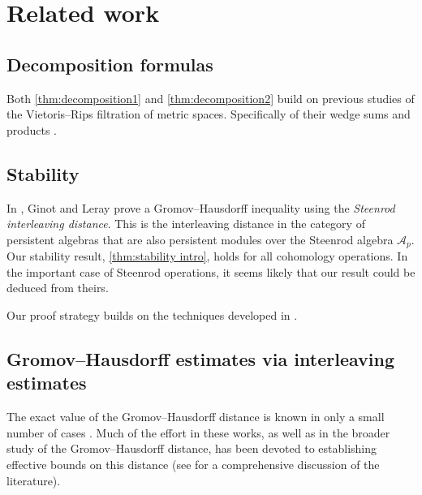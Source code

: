 
\section*{Related work}

\subsection*{Decomposition formulas}


Both \cref{thm:decomposition1} and \cref{thm:decomposition2} build on previous studies of the Vietoris--Rips filtration of metric spaces.
Specifically of their wedge sums \cite{adamaszek2020homotopy} and products \cite{adamaszek2017VietorisProduct, gakhar2019k, lim2024vietoris}.

\subsection*{Stability}

In \cite[Theorem~87]{ginot2019distances}, Ginot and Leray prove a Gromov--Hausdorff inequality using the \textit{Steenrod interleaving distance}.  
This is the interleaving distance in the category of persistent algebras that are also persistent modules over the Steenrod algebra \(\mathcal{A}_p\).
Our stability result, \cref{thm:stability intro}, holds for all cohomology operations.  
In the important case of Steenrod operations, it seems likely that our result could be deduced from theirs.  

Our proof strategy builds on the techniques developed in \cite{zhou2023beyond,memoli2024persistent}.

\subsection*{Gromov--Hausdorff estimates via interleaving estimates} 

The exact value of the Gromov--Hausdorff distance is known in only a small number of cases \cite{memoli2012some,ji2021gromov,adams2022gromov,talipov2022gromov,lim2021gromov,harrison2023quantitative,saul2024gromov,saul2024some}. 
Much of the effort in these works, as well as in the broader study of the Gromov--Hausdorff distance, has been devoted to establishing effective bounds on this distance (see \cite{lim2021gromov} for a comprehensive discussion of the literature).

